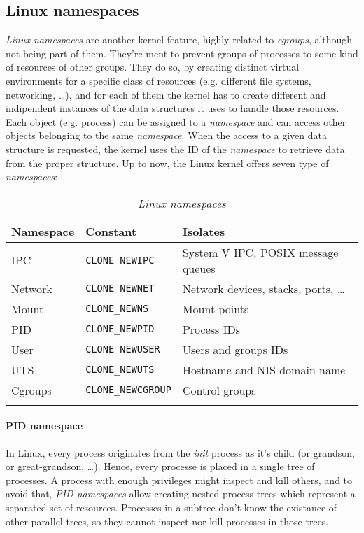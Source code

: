 \subsection{Linux namespaces}
\emph{Linux namespaces} are another kernel feature, highly related to
\emph{cgroups}, although not being part of them. They're ment to prevent
groups of processes to  some kind of resources of other groups. They do
so, by creating distinct virtual environments for a specific class of resources
(e.g. different file systems, networking, \dots), and for each of them the
kernel has to create different and indipendent instances of the data structures
it uses to handle those resources. Each object (e.g. process) can be assigned to
a \emph{namespace} and can access other objects belonging to the same
\emph{namespace}. When the access to a given data structure is requested, the
kernel uses the ID of the \emph{namespace} to retrieve data from the proper
structure. Up to now, the Linux kernel offers seven type of \emph{namespaces}:

{
    \centering
    \renewcommand{\arraystretch}{1.2}
    \begin{longtable}{|l|l|l|}
        \hline
        \textbf{Namespace} & \textbf{Constant} & \textbf{Isolates}\\
        \hline
        IPC & \texttt{CLONE\_NEWIPC} & System V IPC, POSIX message queues\\
        \hline
        Network & \texttt{CLONE\_NEWNET} & Network devices, stacks, ports, \dots\\
        \hline
        Mount & \texttt{CLONE\_NEWNS} & Mount points\\
        \hline
        PID & \texttt{CLONE\_NEWPID} & Process IDs\\
        \hline
        User & \texttt{CLONE\_NEWUSER} & Users and groups IDs\\
        \hline
        UTS & \texttt{CLONE\_NEWUTS} & Hostname and NIS domain name\\
        \hline
        Cgroups & \texttt{CLONE\_NEWCGROUP} & Control groups\\
        \hline
        \caption{\emph{Linux namespaces}}
    \end{longtable}
}

\paragraph{PID namespace}
In Linux, every process originates from the \emph{init} process as it's child
(or grandson, or great-grandson, \dots). Hence, every processe is placed in a
single tree of processes. A process with enough privileges might inspect and
kill others, and to avoid that, \emph{PID namespaces} allow creating nested
process trees which represent a separated set of resources. Processes in a
subtree don't know the existance of other parallel trees, so they cannot inspect
nor kill processes in those trees.

